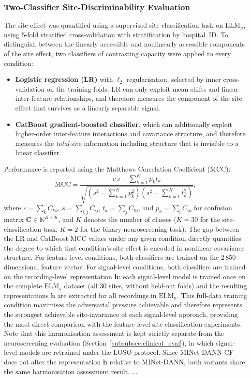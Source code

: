 \documentclass[preprint,12pt]{elsarticle}
\begin{document}
\subsubsection{Two-Classifier Site-Discriminability Evaluation}
\label{subsubsec:two_classifier}
The site effect was quantified using a supervised site-classification
task on $\mathrm{ELM}_n$, using 5-fold stratified cross-validation
with stratification by hospital~ID.
To distinguish between the linearly accessible and nonlinearly
accessible components of the site effect, two classifiers of
contrasting capacity were applied to every condition:
\begin{itemize}
  \item \textbf{Logistic regression (LR)} with $\ell_2$
        regularisation, selected by inner cross-validation on the
        training folds.
        LR can only exploit mean shifts and linear inter-feature
        relationships, and therefore measures the component of the
        site effect that survives as a linearly separable signal.
  \item \textbf{CatBoost gradient-boosted classifier}, which can
        additionally exploit higher-order inter-feature interactions
        and covariance structure, and therefore measures the
        \emph{total} site information including structure that is
        invisible to a linear classifier.
\end{itemize}
Performance is reported using the Matthews Correlation Coefficient
(MCC):
\begin{equation}
  \mathrm{MCC} = \frac{c\,s - \sum_{k=1}^{K} p_k t_k}
    {\sqrt{\!\left(s^2 - \sum_{k=1}^{K} p_k^2\right)
           \!\left(s^2 - \sum_{k=1}^{K} t_k^2\right)}},
  \label{eq:mcc}
\end{equation}
where $c = \sum_k C_{kk}$, $s = \sum_{i,j} C_{ij}$,
$t_k = \sum_j C_{kj}$, and $p_k = \sum_i C_{ik}$ for confusion
matrix $\mathbf{C} \in \mathbb{N}^{K \times K}$, and $K$ denotes
the number of classes ($K = 30$ for the site-classification task;
$K = 2$ for the binary neuroscreening task).
The gap between the LR and CatBoost MCC values under any given
condition directly quantifies the degree to which that condition's
site effect is encoded in nonlinear covariance structure.
For feature-level conditions, both classifiers are trained on the
2\,850-dimensional feature vector.
For signal-level conditions, both classifiers are trained on the
recording-level representation $\mathbf{h}$: each signal-level
model is trained once on the complete $\mathrm{ELM}_s$ dataset
(all 30 sites, without held-out folds) and the resulting
representations $\mathbf{h}$ are extracted for all recordings
in $\mathrm{ELM}_n$.
This full-data training condition maximises the adversarial pressure
achievable and therefore represents the strongest achievable
site-invariance of each signal-level approach, providing the most
direct comparison with the feature-level site-classification
experiments.
Note that this harmonisation assessment is kept strictly separate
from the neuroscreening evaluation
(Section~\ref{subsubsec:clinical_eval}), in which signal-level
models are retrained under the LOSO protocol.
Since \mbox{MINet-DANN-CF} does not alter the representation
$\mathbf{h}$ relative to \mbox{MINet-DANN}, both variants share
the same harmonisation assessment result.
...
\end{document}
